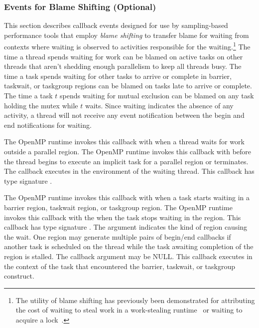 \documentclass{article}
\begin{document}
\subsubsection{Events for Blame Shifting (Optional)}
\label{sec:blame}
This section describes callback events designed for use by sampling-based performance tools 
that employ {\em blame shifting} to transfer blame for waiting from contexts 
where waiting is observed to activities responsible for the waiting.\footnote{The utility of blame shifting has previously been demonstrated for attributing the cost of waiting to steal work 
in a work-stealing runtime~\cite{Tallent:PPoPP09} or waiting to acquire a lock~\cite{Tallent:PPoPP10}.}
The time a thread spends waiting for work can be blamed on active tasks on other threads that aren't shedding enough parallelism to keep all threads busy. 
The time a task spends waiting for other tasks to arrive or complete in barrier, taskwait, or taskgroup regions can be blamed on tasks late to arrive or complete.
The time a task $t$ spends waiting for mutual exclusion can be blamed on any task holding the mutex while $t$ waits.
Since waiting indicates the absence of any activity, a thread will not receive any event notification between the begin and end notifications for waiting.

\begin{description}

\item {}

  \sloppy
  The OpenMP runtime invokes this callback with  when a thread waits for work outside a parallel region.
  The OpenMP runtime invokes this callback with  before the thread  begins to execute an implicit task for
   a parallel region or terminates. The callback executes in the environment of the waiting thread.  
  This callback has type signature . 

\end{description}

\begin{description}

\item {}

  The OpenMP runtime invokes this callback with  when a task starts waiting in a barrier region, taskwait region, or taskgroup region.
   The OpenMP runtime invokes this callback with the  when the task stops waiting in the region.
  This callback has type signature . 
   The argument  indicates the kind of region causing the wait. 
   One region may generate multiple pairs of begin/end callbacks if another task is scheduled on the thread while the task awaiting completion of the region is stalled.
   The callback argument  may be NULL.
   This callback executes in the context of the task that encountered the barrier, taskwait, or taskgroup construct. 
   
\end{description}
\end{document}
